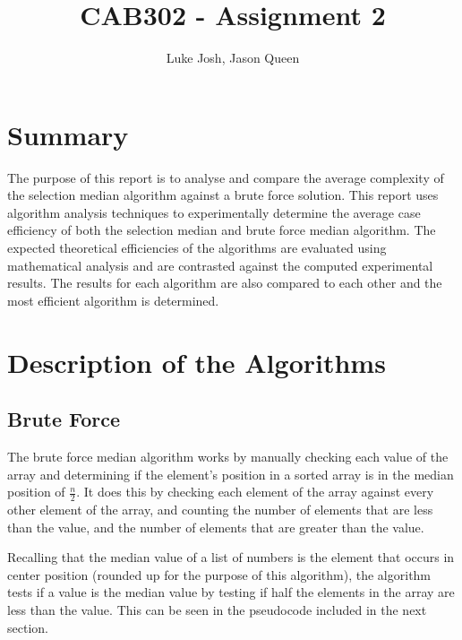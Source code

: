 \documentclass{article}
\title{CAB302 - Assignment 2}
\author{Luke Josh, Jason Queen}
\begin{document}

\maketitle
\tableofcontents

\section{Summary}
    The purpose of this report is to analyse and compare the average complexity of the selection median algorithm against a brute force solution. This report uses algorithm analysis techniques to experimentally determine the average case efficiency of both the selection median and brute force median algorithm. The expected theoretical efficiencies of the algorithms are evaluated using mathematical analysis and are contrasted against the computed experimental results. The results for each algorithm are also compared to each other and the most efficient algorithm is determined.

\section{Description of the Algorithms}
    \subsection{Brute Force}
        The brute force median algorithm works by manually checking each value of the array and determining if the element's position in a sorted array is in the median position of $\frac{n}{2}$. It does this by checking each element of the array against every other element of the array, and counting the number of elements that are less than the value, and the number of elements that are greater than the value.

        Recalling that the median value of a list of numbers is the element that occurs in center position (rounded up for the purpose of this algorithm), the algorithm tests if a value is the median value by testing if half the elements in the array are less than the value. This can be seen in the pseudocode included in the next section.
\end{document}
